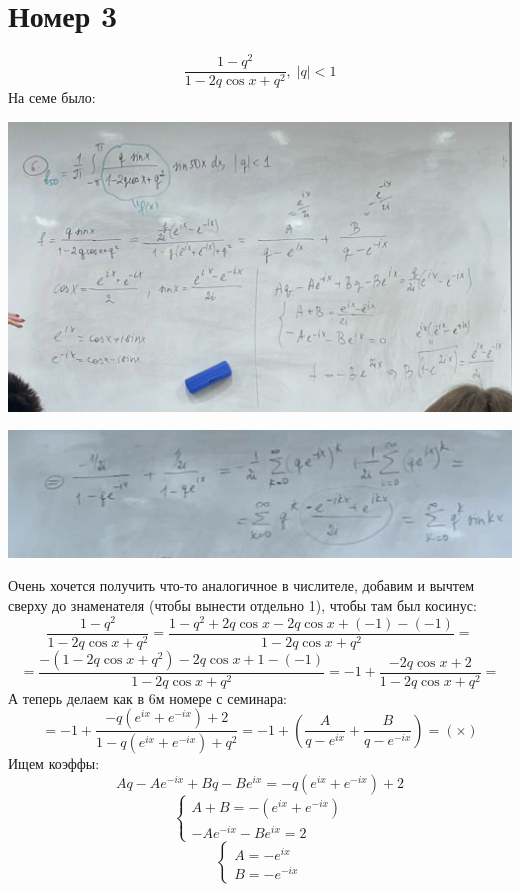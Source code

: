 \documentclass[a4paper,12pt]{article}
\begin{document}
\section*{Номер 3}
\[
\frac{1-q^2}{1-2q \cos x + q^2}, \; |q| < 1
\]
 На семе было:
\begin{center}
\includegraphics[scale=0.3]{3.png}
\end{center}
\begin{center}
\includegraphics[scale=0.5]{4.png}
\end{center}
Очень хочется получить что-то аналогичное в числителе, добавим и вычтем сверху до знаменателя (чтобы вынести отдельно 1), чтобы там был косинус:
\[
\frac{1-q^2}{1-2q \cos x + q^2} = \frac{1-q^2 + 2q\cos x - 2q\cos x + (-1) - (-1)}{1-2q \cos x + q^2} =
\]
\[
= \frac{-(1 - 2q\cos x +q^2) - 2q\cos x + 1 - (-1)}{1-2q \cos x + q^2}  =
-1 + \frac{-2q \cos x + 2}{1 - 2q \cos x + q^2} =
\]
А теперь делаем как в 6м номере с семинара:
\[
=
-1 + \frac{-q (e^{ix}  + e^{-ix}) + 2}{1 - q (e^{ix}  + e^{-ix}) + q^2} = -1 + \left(
\frac{A}{q - e^{ix}} + \frac{B}{q - e^{-ix}}
\right) = (\times)
\]
Ищем коэффы:
\[
Aq - Ae^{-ix} + Bq - Be^{ix} = -q (e^{ix}  + e^{-ix}) + 2
\]
\[
\begin{cases}
A + B = -(e^{ix}  + e^{-ix}) \\
- Ae^{-ix} - Be^{ix}  = 2
\end{cases}
\]
\[
\begin{cases}
A = -e^{ix} \\
B = -e^{-ix}
\end{cases}
\]
\end{document}
